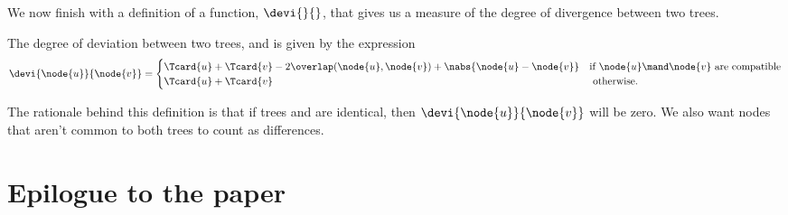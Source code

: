 \begin{definition}



\end{definition}


We now finish with a definition of a function, $\devi{}{}$, that gives us a
measure of the degree of divergence between two trees.
\begin{definition}\label{defdeviation}
  The degree of deviation between two trees,  and  is given  by the expression
  \begin{equation}
    \devi{\node{u}}{\node{v}} = \begin{cases}
      \Tcard{u} + \Tcard{v} - 2\overlap(\node{u},\node{v}) + \nabs{\node{u} - \node{v}}&\text{if }\node{u} \mand \node{v} \text{ are compatible} \\
      \Tcard{u} + \Tcard{v} & \text{ otherwise.}
    \end{cases}
  \end{equation}
  
  The rationale behind this definition is that if trees  and  are identical, then
  $\devi{\node{u}}{\node{v}}$ will be zero. We also want nodes that aren't common to both trees to
  count as differences.
\end{definition}

\section{Epilogue to the paper}

